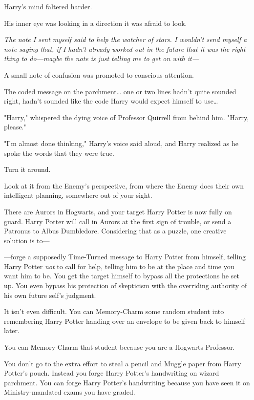 Harry's mind faltered harder.

His inner eye was looking in a direction it was afraid to look.

\emph{The note I sent myself said to help the watcher of stars. I wouldn't send 
myself a note saying that, if I hadn't already worked out in the future that it 
was the right thing to do---maybe the note is just telling me to get on with 
it---}

A small note of confusion was promoted to conscious attention.

The coded message on the parchment{\ldots} one or two lines hadn't quite 
sounded right, hadn't sounded like the code Harry would expect himself to 
use{\ldots}

"Harry," whispered the dying voice of Professor Quirrell from behind him. 
"Harry, please."

"I'm almost done thinking," Harry's voice said aloud, and Harry realized as he 
spoke the words that they were true.

Turn it around.

Look at it from the Enemy's perspective, from where the Enemy does their own 
intelligent planning, somewhere out of your sight.

There are Aurors in Hogwarts, and your target Harry Potter is now fully on 
guard. Harry Potter will call in Aurors at the first sign of trouble, or send a 
Patronus to Albus Dumbledore. Considering that as a puzzle, one creative 
solution is to---

---forge a supposedly Time-Turned message to Harry Potter from himself, telling 
Harry Potter \emph{not} to call for help, telling him to be at the place and 
time you want him to be. You get the target himself to bypass all the 
protections he set up. You even bypass his protection of skepticism with the 
overriding authority of his own future self's judgment.

It isn't even difficult. You can Memory-Charm some random student into 
remembering Harry Potter handing over an envelope to be given back to himself 
later.

You can Memory-Charm that student because you are a Hogwarts Professor.

You don't go to the extra effort to steal a pencil and Muggle paper from Harry 
Potter's pouch. Instead you forge Harry Potter's handwriting on wizard 
parchment. You can forge Harry Potter's handwriting because you have seen it on 
Ministry-mandated exams you have graded.

